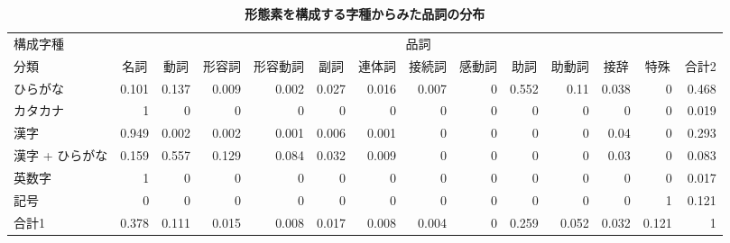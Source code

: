 \begin{table}
\begin{center}
 \caption{\bf 形態素を構成する字種からみた品詞の分布}
 \label{tab:char_type_matrix}
 \tiny
\def\arraystretch{}
 \begin{tabular}{l|r|r|r|r|r|r|r|r|r|r|r|r|r} \hline \hline 
 {構成字種} & \multicolumn{13}{c}{品詞} \\ \cline{2-14}
 {分類}     & \multicolumn{1}{c|}{名詞}
            & \multicolumn{1}{c|}{動詞}
            & \multicolumn{1}{c|}{形容詞}
            & \multicolumn{1}{c|}{形容動詞}
            & \multicolumn{1}{c|}{副詞}
            & \multicolumn{1}{c|}{連体詞}
            & \multicolumn{1}{c|}{接続詞}
            & \multicolumn{1}{c|}{感動詞}
            & \multicolumn{1}{c|}{助詞}
            & \multicolumn{1}{c|}{助動詞}
            & \multicolumn{1}{c|}{接辞}
            & \multicolumn{1}{c|}{特殊}
            & \multicolumn{1}{c}{合計2} \\ \hline  
  ひらがな        & 0.101 & 0.137 & 0.009 & 0.002 & 0.027 
                  & 0.016 & 0.007 &     0 & 0.552 
                  & 0.11 & 0.038 &     0 & 0.468 \\
  \hline 
  カタカナ        & 1     &      0 &      0 &      0 &      0 
                  &      0 &      0 &      0 &      0  
                  &     0  &      0 &      0 & 0.019 \\
  \hline 
  漢字            & 0.949 &  0.002 &  0.002 &  0.001 &  0.006 
                  & 0.001 &      0 &      0 &      0 
                  &     0  &  0.04 &      0 & 0.293 \\
  \hline
  漢字 + ひらがな & 0.159 & 0.557 & 0.129 & 0.084 & 0.032  
                  & 0.009 &     0 &     0 &     0  
                  &     0 &  0.03 &    0 & 0.083 \\
  \hline
  英数字          & 1 &      0 &      0 &     0 &     0 
                  &  0 &     0 &      0 &     0 
                  &      0 &      0 &      0 & 0.017 \\
  \hline
  記号            &      0 &      0 &      0 &      0 &      0 
                  &      0 &      0 &      0 &      0  
                  &      0 &      0 & 1  & 0.121 \\
  \hline
  合計1           & 0.378 & 0.111 &  0.015 &  0.008 &  0.017 
                  &  0.008 &  0.004 &      0 & 0.259 
                  &  0.052 &  0.032 & 0.121 & 1 \\
   \hline
 \end{tabular}
\end{center}

\end{table}

